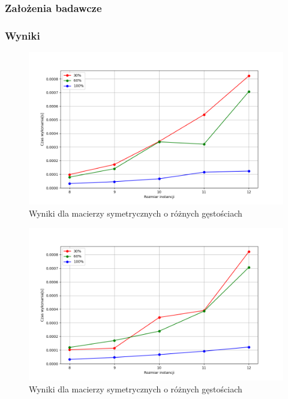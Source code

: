 \documentclass{article}
\begin{document}
  \subsubsection{Założenia badawcze}
  \subsubsection{Wyniki}
  
  \FloatBarrier

  \begin{figure}[ht]
    \centering
    \includegraphics[width=\textwidth]{src/plots/asymnearest-neighbourresoult.png}
    \caption{Wyniki dla macierzy symetrycznych o różnych gęstościach}
    \label{fig:asm_nn}
  \end{figure}
  \begin{figure}[ht]
    \centering
    \includegraphics[width=\textwidth]{src/plots/symnearest-neighbourresoult.png}
    \caption{Wyniki dla macierzy symetrycznych o różnych gęstościach}
    \label{fig:sm_nn}
  \end{figure}
  \FloatBarrier
\end{document}
